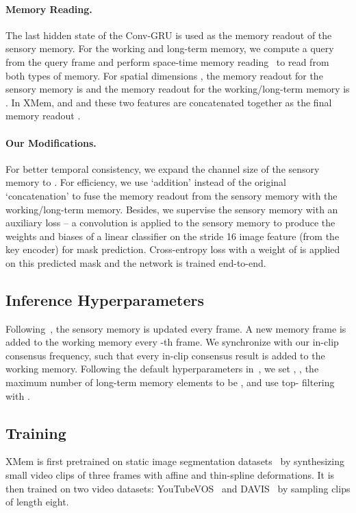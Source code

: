\paragraph{Memory Reading.}
The last hidden state of the Conv\nobreakdash-GRU is used as the memory readout of the sensory memory. For the working and long-term memory, we compute a query from the query frame and perform space-time memory reading~\cite{oh2019videoSTM} to read from both types of memory.
For spatial dimensions , the memory readout for the sensory memory is  and the memory readout for the working/long-term memory is . In XMem,  and  and these two features are concatenated together as the final memory readout .

\paragraph{Our Modifications.}
For better temporal consistency, we expand the channel size  of the sensory memory to . 
For efficiency, we use `addition' instead of the original `concatenation' to fuse the memory readout from the sensory memory with the working/long-term memory.
Besides, we supervise the sensory memory with an auxiliary loss -- a  convolution is applied to the sensory memory to produce the weights and biases of a linear classifier on the stride 16 image feature (from the key encoder) for mask prediction. Cross-entropy loss with a weight of  is applied on this predicted mask and the network is trained end-to-end.

\subsection{Inference Hyperparameters}
Following~\cite{cheng2022xmem}, the sensory memory is updated every frame. A new memory frame is added to the working memory every -th frame. We synchronize  with our in-clip consensus frequency, such that every in-clip consensus result is added to the working memory. Following the default hyperparameters in~\cite{cheng2022xmem}, we set , , the maximum number of long-term memory elements to be , and use top- filtering~\cite{cheng2021mivos} with . 

\subsection{Training}\label{sec:app:temporal-training}
XMem is first pretrained on static image segmentation datasets~\cite{shi2015hierarchicalECSSD,wang2017DUTS,zeng2019towardsHRSOD,li2020fss,cheng2020cascadepsp} by synthesizing small video clips of three frames with affine and thin-spline deformations. It is then trained on two video datasets: YouTubeVOS~\cite{xu2018youtubeVOS} and DAVIS~\cite{perazzi2016benchmark} by sampling clips of length eight.

